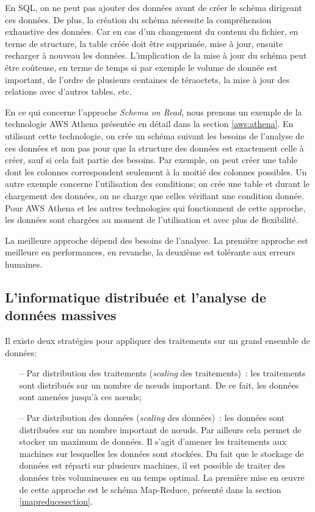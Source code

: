 En SQL, on ne peut pas ajouter des données avant de créer le schéma dirigeant ces données. De plus, la création du schéma nécessite la compréhension  exhaustive des données. 
Car en cas d'un changement du contenu du fichier, en terme de structure, la table créée doit être supprimée, mise à jour, ensuite recharger à nouveau les données. L'implication de la mise à jour du schéma peut être coûteuse, en terme de temps  si par exemple  le volume de donnée est important, de l'ordre de plusieurs centaines de téraoctets, la mise à jour des relations avec d'autres tables, etc.

En ce qui concerne l'approche \textit{Schema on Read}, nous prenons un exemple de la technologie AWS Athena présentée en détail dans la section \ref{aws:athena}. En utilisant cette technologie, on crée un schéma suivant les besoins de l'analyse de ces données et non pas pour que la structure des données est exactement celle à créer, sauf si cela fait partie des besoins. Par exemple, on peut créer une table dont les colonnes correspondent  seulement à la moitié des colonnes possibles. Un autre exemple concerne l'utilisation  des conditions; on crée une table et durant le chargement des données, on ne charge que celles vérifiant une condition donnée. Pour AWS Athena et les autres technologies qui fonctionnent de cette approche, les données sont chargées au moment de l'utilisation et avec plus de flexibilité.

		
La meilleure approche dépend des besoins de l'analyse. La première approche est meilleure en performances, en revanche, la deuxième est tolérante aux erreurs  humaines.
		
		
		\subsection{L'informatique distribuée et l'analyse de données massives} \label{sec:distruted-camput}
		Il existe deux stratégies pour appliquer des traitements sur un grand ensemble de données: 
		
		
		\begin{itemize}
			\item[--] Par distribution des traitements (\textit{scaling} des traitements)~: les traitements sont distribués sur un nombre de n\oe{}uds important. De ce fait, les données sont amenées jusqu'à ces n\oe{}uds;
			
			\item[--] Par distribution des données (\textit{scaling} des données)~: les données sont distribuées sur un nombre important de n\oe{}uds. Par ailleurs cela permet  de stocker un maximum de données. Il s'agit d'amener les traitements aux machines sur lesquelles les données sont stockées. Du fait que le stockage de données est réparti sur plusieurs machines, il est possible de traiter des données très volumineuses en un temps optimal. La première mise en \oe{}uvre de cette approche est le schéma Map-Reduce,  présenté dans la section  \ref{mapreducesection}. 
		\end{itemize}
